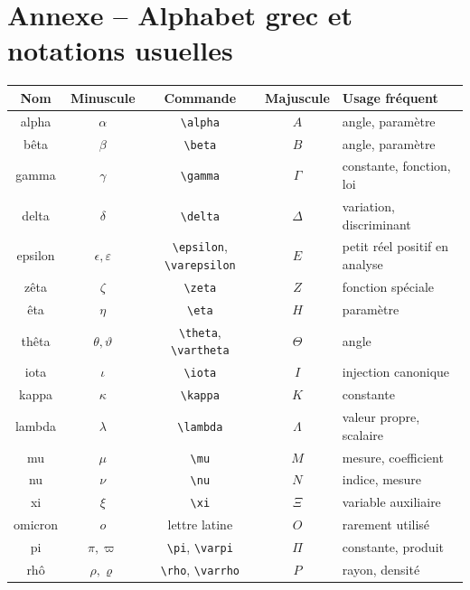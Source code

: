 \documentclass[11pt,a4paper]{article}
\begin{document}
\appendix
\section{Annexe -- Alphabet grec et notations usuelles}

\renewcommand{\arraystretch}{1.25}
\begin{center}
\begin{tabularx}{\textwidth}{|c|c|c|c|X|}
\hline
\textbf{Nom} & \textbf{Minuscule} & \textbf{Commande} & \textbf{Majuscule} & \textbf{Usage fréquent}\\
\hline
alpha & \(\alpha\) & \verb|\alpha| & \(A\) & angle, paramètre\\
\hline
bêta & \(\beta\) & \verb|\beta| & \(B\) & angle, paramètre\\
\hline
gamma & \(\gamma\) & \verb|\gamma| & \(\Gamma\) & constante, fonction, loi\\
\hline
delta & \(\delta\) & \verb|\delta| & \(\Delta\) & variation, discriminant\\
\hline
epsilon & \(\epsilon,\varepsilon\) & \verb|\epsilon|, \verb|\varepsilon| & \(E\) & petit réel positif en analyse\\
\hline
zêta & \(\zeta\) & \verb|\zeta| & \(Z\) & fonction spéciale\\
\hline
êta & \(\eta\) & \verb|\eta| & \(H\) & paramètre\\
\hline
thêta & \(\theta,\vartheta\) & \verb|\theta|, \verb|\vartheta| & \(\Theta\) & angle\\
\hline
iota & \(\iota\) & \verb|\iota| & \(I\) & injection canonique\\
\hline
kappa & \(\kappa\) & \verb|\kappa| & \(K\) & constante\\
\hline
lambda & \(\lambda\) & \verb|\lambda| & \(\Lambda\) & valeur propre, scalaire\\
\hline
mu & \(\mu\) & \verb|\mu| & \(M\) & mesure, coefficient\\
\hline
nu & \(\nu\) & \verb|\nu| & \(N\) & indice, mesure\\
\hline
xi & \(\xi\) & \verb|\xi| & \(\Xi\) & variable auxiliaire\\
\hline
omicron & \(o\) & lettre latine & \(O\) & rarement utilisé\\
\hline
pi & \(\pi,\varpi\) & \verb|\pi|, \verb|\varpi| & \(\Pi\) & constante, produit\\
\hline
rhô & \(\rho,\varrho\) & \verb|\rho|, \verb|\varrho| & \(P\) & rayon, densité\\

\end{tabularx}
\end{center}
\end{document}
